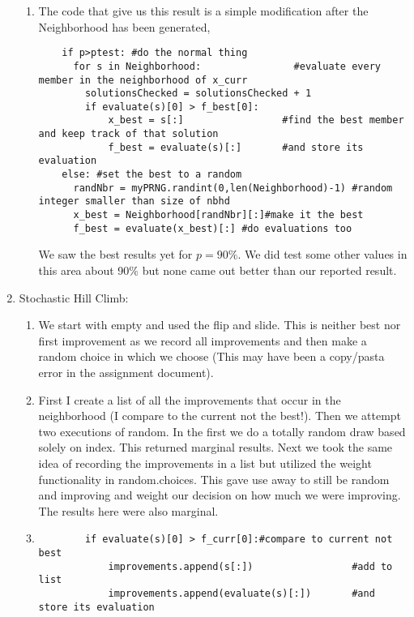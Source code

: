\documentclass[11pt]{article}
\begin{document}
\begin{enumerate}
\begin{enumerate}
\item 
The code that give us this result is a simple modification after the Neighborhood has been generated,
\begin{verbatim}
    if p>ptest: #do the normal thing
      for s in Neighborhood:                #evaluate every member in the neighborhood of x_curr
        solutionsChecked = solutionsChecked + 1
        if evaluate(s)[0] > f_best[0]:
            x_best = s[:]                 #find the best member and keep track of that solution
            f_best = evaluate(s)[:]       #and store its evaluation
    else: #set the best to a random
      randNbr = myPRNG.randint(0,len(Neighborhood)-1) #random integer smaller than size of nbhd
      x_best = Neighborhood[randNbr][:]#make it the best 
      f_best = evaluate(x_best)[:] #do evaluations too
\end{verbatim} 


We saw the best results yet for $p = 90\%$.  We did test some other values in this area about 90\% but none came out better than our reported result.

\end{enumerate}

\item Stochastic Hill Climb:  
\begin{enumerate}
\item We start with empty and used the flip and slide.  This is neither best nor first improvement as we record all improvements and then make a random choice in which we choose (This may have been a copy/pasta error in the assignment document).  

\item First I create a list of all the improvements that occur in the neighborhood (I compare to the current not the best!).  Then we attempt two executions of random.  In the first we do a totally random draw based solely on index.  This returned marginal results.  Next we took the same idea of recording the improvements in a list but utilized the weight functionality in random.choices.  This gave use away to still be random and improving and weight our decision on how much we were improving. The results here were also marginal.

\item 
\begin{verbatim}
        if evaluate(s)[0] > f_curr[0]:#compare to current not best
            improvements.append(s[:])                 #add to list
            improvements.append(evaluate(s)[:])       #and store its evaluation


\end{verbatim}
\end{enumerate}
\end{enumerate}
\end{document}
